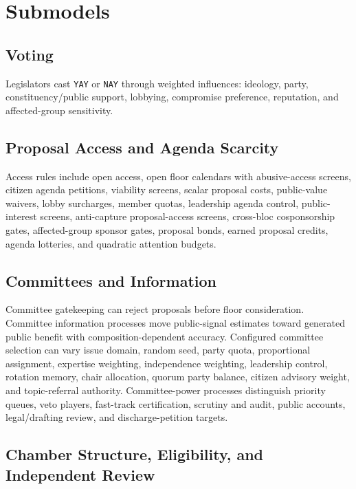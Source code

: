 \documentclass[manuscript,review,anonymous]{acmart}
\begin{document}


\section{Submodels}

\subsection{Voting}

Legislators cast \texttt{YAY} or \texttt{NAY} through weighted influences: ideology, party, constituency/public support, lobbying, compromise preference, reputation, and affected-group sensitivity.

\subsection{Proposal Access and Agenda Scarcity}

Access rules include open access, open floor calendars with abusive-access screens, citizen agenda petitions, viability screens, scalar proposal costs, public-value waivers, lobby surcharges, member quotas, leadership agenda control, public-interest screens, anti-capture proposal-access screens, cross-bloc cosponsorship gates, affected-group sponsor gates, proposal bonds, earned proposal credits, agenda lotteries, and quadratic attention budgets.

\subsection{Committees and Information}

Committee gatekeeping can reject proposals before floor consideration. Committee information processes move public-signal estimates toward generated public benefit with composition-dependent accuracy. Configured committee selection can vary issue domain, random seed, party quota, proportional assignment, expertise weighting, independence weighting, leadership control, rotation memory, chair allocation, quorum party balance, citizen advisory weight, and topic-referral authority. Committee-power processes distinguish priority queues, veto players, fast-track certification, scrutiny and audit, public accounts, legal/drafting review, and discharge-petition targets.

\subsection{Chamber Structure, Eligibility, and Independent Review}
\end{document}
